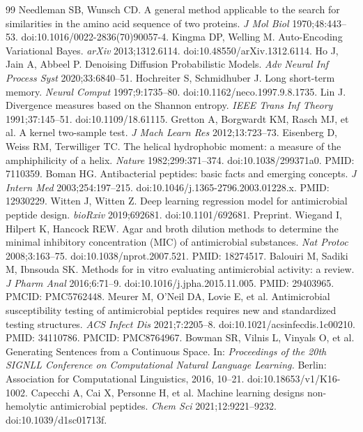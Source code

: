 \documentclass[unnumsec,webpdf,contemporary,large]{oup-authoring-template}
\newcommand{\rev}[1]{#1}
\begin{document}
\begin{thebibliography}{99}
 Needleman SB, Wunsch CD. A general method applicable to the search for similarities in the amino acid sequence of two proteins. \textit{J Mol Biol} 1970;48:443--53. doi:10.1016/0022-2836(70)90057-4.
 Kingma DP, Welling M. Auto-Encoding Variational Bayes. \textit{arXiv} 2013;1312.6114. doi:10.48550/arXiv.1312.6114.
 Ho J, Jain A, Abbeel P. Denoising Diffusion Probabilistic Models. \textit{Adv Neural Inf Process Syst} 2020;33:6840--51.
 Hochreiter S, Schmidhuber J. Long short-term memory. \textit{Neural Comput} 1997;9:1735--80. doi:10.1162/neco.1997.9.8.1735.
 Lin J. Divergence measures based on the Shannon entropy. \textit{IEEE Trans Inf Theory} 1991;37:145--51. doi:10.1109/18.61115.
 Gretton A, Borgwardt KM, Rasch MJ, et al. A kernel two-sample test. \textit{J Mach Learn Res} 2012;13:723--73.
 \rev{Eisenberg D, Weiss RM, Terwilliger TC. The helical hydrophobic moment: a measure of the amphiphilicity of a helix. \textit{Nature} 1982;299:371--374. doi:10.1038/299371a0. PMID: 7110359.}
 \rev{Boman HG. Antibacterial peptides: basic facts and emerging concepts. \textit{J Intern Med} 2003;254:197--215. doi:10.1046/j.1365-2796.2003.01228.x. PMID: 12930229.}
 Witten J, Witten Z. Deep learning regression model for antimicrobial peptide design. \textit{bioRxiv} 2019;692681. doi:10.1101/692681. Preprint.
 Wiegand I, Hilpert K, Hancock REW. Agar and broth dilution methods to determine the minimal inhibitory concentration (MIC) of antimicrobial substances. \textit{Nat Protoc} 2008;3:163--75. doi:10.1038/nprot.2007.521. PMID: 18274517.
 Balouiri M, Sadiki M, Ibnsouda SK. Methods for in vitro evaluating antimicrobial activity: a review. \textit{J Pharm Anal} 2016;6:71--9. doi:10.1016/j.jpha.2015.11.005. PMID: 29403965. PMCID: PMC5762448.
 Meurer M, O'Neil DA, Lovie E, et al. Antimicrobial susceptibility testing of antimicrobial peptides requires new and standardized testing structures. \textit{ACS Infect Dis} 2021;7:2205--8. doi:10.1021/acsinfecdis.1c00210. PMID: 34110786. PMCID: PMC8764967.
 Bowman SR, Vilnis L, Vinyals O, et al. Generating Sentences from a Continuous Space. In: \textit{Proceedings of the 20th SIGNLL Conference on Computational Natural Language Learning.} Berlin: Association for Computational Linguistics, 2016, 10--21. doi:10.18653/v1/K16-1002.
 Capecchi A, Cai X, Personne H, et al. Machine learning designs non-hemolytic antimicrobial peptides. \textit{Chem Sci} 2021;12:9221--9232. doi:10.1039/d1sc01713f.

\end{thebibliography}
\end{document}
